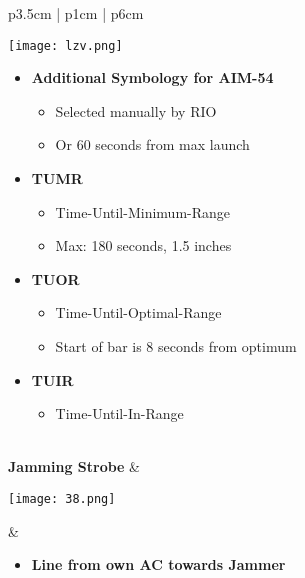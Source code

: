 \documentclass[10pt,usenames,dvipsnames,twoside]{report}
\begin{document}
\begin{center}
\begin{longtable}{p{3.5cm} | p{1cm} |  p{6cm}}
			\begin{minipage}[t]{\linewidth}
				\vspace{-7pt}
				\centering
				\texttt{[image: lzv.png]}
			\end{minipage}
			\begin{minipage}[t]{\linewidth}
				\begin{itemize}
					\item \textbf{Additional Symbology for AIM-54}
					\begin{itemize}
						\item Selected manually by RIO
						\item Or 60 seconds from max launch
					\end{itemize}
					\item \textbf{TUMR}
					\begin{itemize}
						\item Time-Until-Minimum-Range
						\item Max: 180 seconds, 1.5 inches
					\end{itemize}
					\item \textbf{TUOR}
					\begin{itemize}
						\item Time-Until-Optimal-Range
						\item Start of bar is 8 seconds from optimum
					\end{itemize}
					\item \textbf{TUIR}
					\begin{itemize}
						\item Time-Until-In-Range
					\end{itemize}
				\end{itemize}
			\end{minipage} \\
			\midrule
			\textbf{Jamming Strobe} &
			\begin{minipage}[t]{\linewidth}
				\vspace{-7pt}
				\centering
				\texttt{[image: 38.png]}
			\end{minipage} &
			\begin{minipage}[t]{\linewidth}
				\vspace{-7pt}
				\begin{itemize}
					\item \textbf{Line from own AC towards Jammer}
				\end{itemize}
			\end{minipage} \\

\end{longtable}
\end{center}
\end{document}

